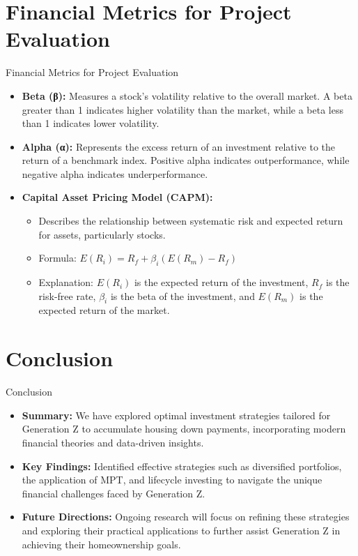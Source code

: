 \documentclass{beamer}
\begin{document}
\section{Financial Metrics for Project Evaluation}
\begin{frame}{Financial Metrics for Project Evaluation}
    \begin{itemize}
        \item \textbf{Beta (β):} Measures a stock's volatility relative to the overall market. A beta greater than 1 indicates higher volatility than the market, while a beta less than 1 indicates lower volatility.
        \item \textbf{Alpha (α):} Represents the excess return of an investment relative to the return of a benchmark index. Positive alpha indicates outperformance, while negative alpha indicates underperformance.
        \item \textbf{Capital Asset Pricing Model (CAPM):}
        \begin{itemize}
            \item Describes the relationship between systematic risk and expected return for assets, particularly stocks.
            \item Formula: \( E(R_i) = R_f + \beta_i (E(R_m) - R_f) \)
            \item Explanation: \( E(R_i) \) is the expected return of the investment, \( R_f \) is the risk-free rate, \( \beta_i \) is the beta of the investment, and \( E(R_m) \) is the expected return of the market.
        \end{itemize}
    \end{itemize}
\end{frame}

\section{Conclusion}
\begin{frame}{Conclusion}
    \begin{itemize}
        \item \textbf{Summary:} We have explored optimal investment strategies tailored for Generation Z to accumulate housing down payments, incorporating modern financial theories and data-driven insights.
        \item \textbf{Key Findings:} Identified effective strategies such as diversified portfolios, the application of MPT, and lifecycle investing to navigate the unique financial challenges faced by Generation Z.
        \item \textbf{Future Directions:} Ongoing research will focus on refining these strategies and exploring their practical applications to further assist Generation Z in achieving their homeownership goals.
    \end{itemize}
\end{frame}
\end{document}
